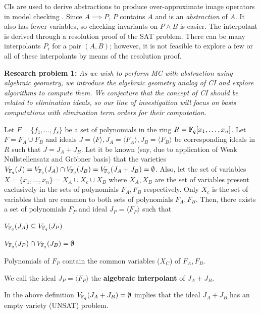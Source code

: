 CIs are used to derive abstractions to produce over-approximate image
operators in model checking \cite{mcmillan2003interpolation}. Since $A
\implies P$, $P$ contains $A$ and is an {\it abstraction} of $A$. It
also has fewer variables, so checking  invariants on $P \wedge B$ is
easier. The interpolant is derived through a resolution proof of the
SAT problem. There can be many interpolants $P_i$ for a pair $(A,B)$; 
however, it is not feasible to explore a few or all of these
interpolants by means of the resolution proof. 

{\bf Research problem 1:}
{\it As we wish to perform MC with abstraction using algebraic
  geometry, we introduce the algebraic geometry analog of CI
  and explore algorithms to compute them. We conjecture that the
  concept of CI should be related to elimination ideals, so our line
  of investigation will focus on \Grobner basis computations with
  elimination term orders for their computation.
}


\begin{Definition}\label{ci}
Let $F = \{f_1, \dots, f_s\}$ be a set of polynomials in the ring 
$R = {\mathbb{F}}_{q}[x_1,\dots,x_n]$. Let $F = F_A \cup F_B$ and ideals $J =
\langle F \rangle, J_A = \langle F_A \rangle, J_B = \langle F_B
\rangle$ be corresponding ideals in $R$ such that $J = J_A + J_B$. Let
it be known (say, due to application of Weak Nullstellensatz and
Gr\"obner basis) that the varieties $V_{{\mathbb{F}}_{q}}(J) = V_{{\mathbb{F}}_{q}}(J_A) \cap
V_{{\mathbb{F}}_{q}}(J_B) =V_{{\mathbb{F}}_{q}}(J_A+J_B)=\emptyset$. Also, let the set of
variables $X = \{x_1,\dots,x_n\} = X_A \cup X_c \cup X_B$ where $X_A,
X_B$ are the set of variables present exclusively in the sets of
polynomials $F_A, F_B$ respectively. Only $X_c$ is the set of
variables that are common to both sets of polynomials $F_A,
F_B$. Then, there exists a set of polynomials  $F_P$ and ideal $J_P =
\langle F_P \rangle$ such that 
\bi
\item $V_{{\mathbb{F}}_{q}}(J_A) \subseteq V_{{\mathbb{F}}_{q}}(J_P)$
\item $V_{{\mathbb{F}}_{q}}(J_P) \cap V_{{\mathbb{F}}_{q}}(J_B) = \emptyset$
\item Polynomials of $F_P$ contain the common variables ($X_C$) of
  $F_A, F_B$. 
\ei

We call the ideal $J_P = \langle F_P\rangle$ the {\bf algebraic
  interpolant} of  $J_A+J_B$. 
\end{Definition}

In the above definition $V_{{\mathbb{F}}_{q}}(J_A+J_B)=\emptyset$ implies that the
ideal $J_A+J_B$ has an empty variety (UNSAT) problem. 

